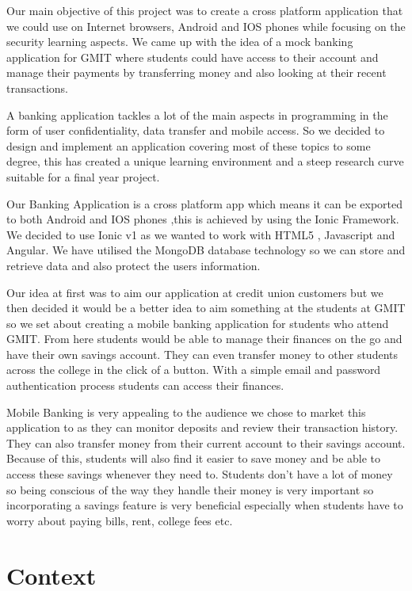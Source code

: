 Our main objective of this project was to create a cross platform application that we could use on Internet browsers, Android and IOS phones while focusing on the security learning aspects. We came up with the idea of a mock banking application for GMIT where students could have access to their account and manage their payments by transferring  money and also looking at their recent transactions.

A banking application tackles a lot of the main aspects in programming in the form of user
confidentiality, data transfer and mobile access. So we decided to design and implement an application covering most of these topics to some degree,  this has created a unique learning environment and a steep research curve suitable for a final year project.

	Our Banking Application is a cross platform app which means it can be exported to both
Android and IOS phones ,this is achieved by using the Ionic Framework. We decided to use Ionic v1 as we wanted to work with HTML5 , Javascript and Angular. We have utilised the  MongoDB database technology so we can store and retrieve data and also protect the users information.

Our idea at first was to aim our application at credit union customers but we then decided it would be a better idea to aim something at the students at GMIT so we set about creating a mobile banking application for students who attend GMIT. From here students would be able to manage their finances on the go and have their own savings account. They can even transfer money to other students across the college in the click of a button. With a simple email and password authentication process students can access their finances.

Mobile Banking is very appealing to the audience we chose to market this application to as they can monitor deposits and review their transaction history. They can also transfer money from their current account to their savings account. Because of this, students will also find it easier to save money and be able to access these savings whenever they need to. Students don’t have a lot of money so being conscious of the way they handle their money is very important so incorporating a savings feature is very beneficial especially when students have to worry about paying bills, rent, college fees etc.




\chapter{Context}


